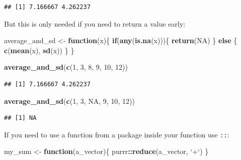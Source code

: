 \documentclass[]{gitbook}
\newenvironment{Shaded}{\begin{snugshade}}{\end{snugshade}}
\newcommand{\ControlFlowTok}[1]{\textcolor[rgb]{0.13,0.29,0.53}{\textbf{#1}}}
\newcommand{\DataTypeTok}[1]{\textcolor[rgb]{0.13,0.29,0.53}{#1}}
\newcommand{\DecValTok}[1]{\textcolor[rgb]{0.00,0.00,0.81}{#1}}
\newcommand{\KeywordTok}[1]{\textcolor[rgb]{0.13,0.29,0.53}{\textbf{#1}}}
\newcommand{\NormalTok}[1]{#1}
\newcommand{\OperatorTok}[1]{\textcolor[rgb]{0.81,0.36,0.00}{\textbf{#1}}}
\newcommand{\OtherTok}[1]{\textcolor[rgb]{0.56,0.35,0.01}{#1}}
\newcommand{\StringTok}[1]{\textcolor[rgb]{0.31,0.60,0.02}{#1}}
\begin{document}
\begin{verbatim}
## [1] 7.166667 4.262237
\end{verbatim}

But this is only needed if you need to return a value early:

\begin{Shaded}
\begin{Highlighting}[]
\NormalTok{average_and_sd <-}\StringTok{ }\ControlFlowTok{function}\NormalTok{(x)\{}
\ControlFlowTok{if}\NormalTok{(}\KeywordTok{any}\NormalTok{(}\KeywordTok{is.na}\NormalTok{(x)))\{}
    \KeywordTok{return}\NormalTok{(}\OtherTok{NA}\NormalTok{)}
\NormalTok{  \} }\ControlFlowTok{else}\NormalTok{ \{}
    \KeywordTok{c}\NormalTok{(}\KeywordTok{mean}\NormalTok{(x), }\KeywordTok{sd}\NormalTok{(x))}
\NormalTok{    \}}
\NormalTok{\}}

\KeywordTok{average_and_sd}\NormalTok{(}\KeywordTok{c}\NormalTok{(}\DecValTok{1}\NormalTok{, }\DecValTok{3}\NormalTok{, }\DecValTok{8}\NormalTok{, }\DecValTok{9}\NormalTok{, }\DecValTok{10}\NormalTok{, }\DecValTok{12}\NormalTok{))}
\end{Highlighting}
\end{Shaded}

\begin{verbatim}
## [1] 7.166667 4.262237
\end{verbatim}

\begin{Shaded}
\begin{Highlighting}[]
\KeywordTok{average_and_sd}\NormalTok{(}\KeywordTok{c}\NormalTok{(}\DecValTok{1}\NormalTok{, }\DecValTok{3}\NormalTok{, }\OtherTok{NA}\NormalTok{, }\DecValTok{9}\NormalTok{, }\DecValTok{10}\NormalTok{, }\DecValTok{12}\NormalTok{))}
\end{Highlighting}
\end{Shaded}

\begin{verbatim}
## [1] NA
\end{verbatim}

If you need to use a function from a package inside your function use \texttt{::}:

\begin{Shaded}
\begin{Highlighting}[]
\NormalTok{my_sum <-}\StringTok{ }\ControlFlowTok{function}\NormalTok{(a_vector)\{}
\NormalTok{  purrr}\OperatorTok{::}\KeywordTok{reduce}\NormalTok{(a_vector, }\StringTok{`}\DataTypeTok{+}\StringTok{`}\NormalTok{)}
\NormalTok{\}}
\end{Highlighting}
\end{Shaded}
\end{document}
